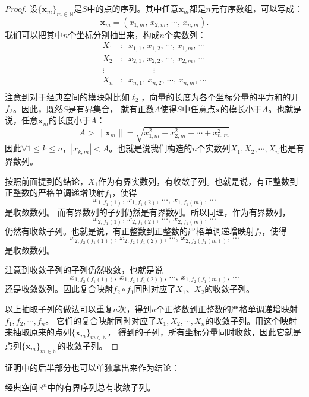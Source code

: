 \documentclass[12pt,UTF8,fontset=none]{ctexbook}
\begin{document}
\begin{appendix}
\begin{proof}
    设$\{\mathbf{x}_m\}_{m\in\mathbb{N}}$是$S$中的点的序列。其中任意$\mathbf{x}_m$都是$n$元有序数组，可以写成：
    $$ \mathbf{x}_m = (x_{1,m},\, x_{2,m},\,\cdots, \, x_{n,m}). $$
    我们可以把其中$n$个坐标分别抽出来，构成$n$个实数列：
    \begin{align*}
        X_1 &:\;\; x_{1,1}, \, x_{1,2},\, \cdots, \, x_{1,m}, \, \cdots \\
        X_2 &:\;\; x_{2,1}, \, x_{2,2},\, \cdots, \, x_{2,m}, \, \cdots \\
        \vdots& \qquad \qquad \vdots \\
        X_n &:\;\; x_{n,1}, \, x_{n,2},\, \cdots, \, x_{n,m}, \, \cdots \\
    \end{align*}
    注意到对于经典空间的模映射比如$\ell_2$，向量的长度为各个坐标分量的平方和的开方。因此，既然$S$是有界集合，
    就有正数$A$使得$S$中任意点$\mathbf{x}$的模长小于$A$。也就是说，任意$\mathbf{x}_m$的长度小于$A$：
    $$ A > \| \mathbf{x}_m \| = \sqrt{x_{1,m}^2 +  x_{2,m}^2 + \cdots + x_{n,m}^2}$$
    因此$\forall 1\leqslant k \leqslant n$，$|x_{k,m}| < A$。也就是说我们构造的$n$个实数列$X_1,X_2,\cdots,X_n$也是有界数列。

    按照前面提到的结论，$X_1$作为有界实数列，有收敛子列。也就是说，有正整数到正整数的严格单调递增映射$f_1$，使得
    $$ x_{1,f_1(1)}, \, x_{1,f_1(2)},\, \cdots, \, x_{1,f_1(m)}, \, \cdots $$
    是收敛数列。
    而有界数列的子列仍然是有界数列。所以同理，作为有界数列，
    $$ x_{2,f_1(1)}, \, x_{2,f_1(2)},\, \cdots, \, x_{2,f_1(m)}, \, \cdots $$
    仍然有收敛子列。也就是说，有正整数到正整数的严格单调递增映射$f_2$，使得
    $$ x_{2,f_2(f_1(1))}, \, x_{2,f_2(f_1(2))},\, \cdots, \, x_{2,f_2(f_1(m))}, \, \cdots $$
    是收敛数列。

    注意到收敛子列的子列仍然收敛，也就是说
    $$ x_{1,f_2(f_1(1))}, \, x_{1,f_2(f_1(2))},\, \cdots, \, x_{1,f_2(f_1(m))}, \, \cdots $$
    还是收敛数列。因此复合映射$f_2\circ f_1$同时对应了$X_1$、$X_2$的收敛子列。

    以上抽取子列的做法可以重复$n$次，得到$n$个正整数到正整数的严格单调递增映射$f_1, f_2, \cdots ,f_n$。
    它们的复合映射同时对应了$X_1,X_2,\cdots,X_n$的收敛子列。用这个映射来抽取原来的点列$\{\mathbf{x}_m\}_{m\in\mathbb{N}}$，
    得到的子列，所有坐标分量同时收敛，因此它就是点列$\{\mathbf{x}_m\}_{m\in\mathbb{N}}$的收敛子列。

\end{proof}

证明中的后半部分也可以单独拿出来作为结论：
\begin{tm}
    经典空间$\mathbb{R}^n$中的有界序列总有收敛子列。
\end{tm}


\end{appendix}
\end{document}
